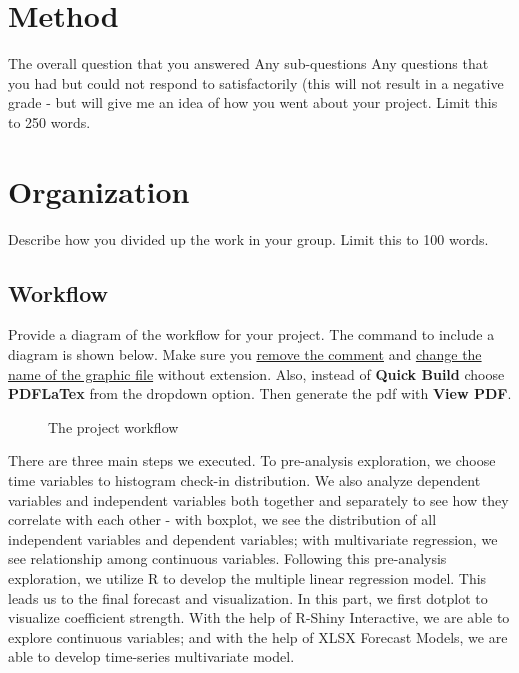 \documentclass{article}
\begin{document}
\section{Method}

The overall question that you answered
Any sub-questions
Any questions that you had but could not respond to satisfactorily (this will not result in a negative grade - but will give me an idea of how you went about your project. Limit this to 250 words.

\section{Organization}

Describe how you divided up the work in your group. Limit this to 100 words.


\subsection{Workflow}

Provide a diagram of the workflow for your project. The command to include a diagram is shown below. Make sure you \underline{remove the comment} and \underline{change the name of the graphic file} without extension. Also, instead of \textbf{Quick Build} choose \textbf{PDFLaTex} from the dropdown option. Then generate the pdf with \textbf{View PDF}.



\begin{figure}[hb]
  \centering
  \caption{The project workflow}

\end{figure}


There are three main steps we executed. To pre-analysis exploration, we choose time variables to histogram check-in distribution. We also analyze dependent variables and independent variables both together and separately to see how they correlate with each other - with boxplot, we see the distribution of all independent variables and dependent variables; with multivariate regression, we see relationship among continuous variables. Following this pre-analysis exploration, we utilize R to develop the multiple linear regression model. This leads us to the final forecast and visualization. In this part, we first dotplot to visualize coefficient strength. With the help of R-Shiny Interactive, we are able to explore continuous variables; and with the help of XLSX Forecast Models, we are able to develop time-series multivariate model.
\end{document}
